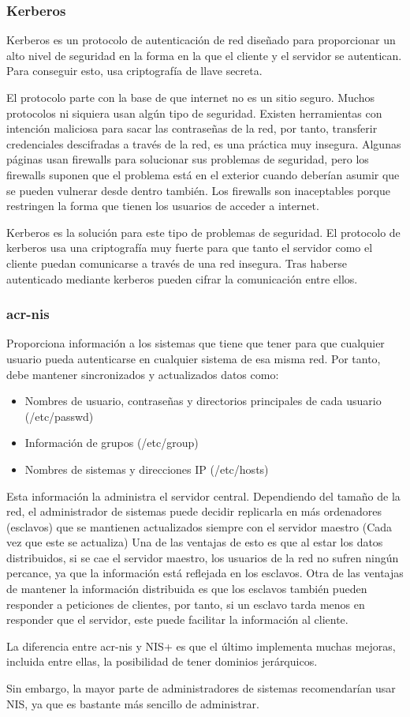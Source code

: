 \documentclass[titlepage, 12pt, a4paper]{article}
\begin{document}
\subsubsection{Kerberos}
Kerberos es un protocolo de autenticación de red diseñado para proporcionar un alto nivel de seguridad en la forma en la que el cliente y el servidor se autentican. Para conseguir esto, usa criptografía de llave secreta.\cite{mit-kerberos}\par El protocolo parte con la base de que internet no es un sitio seguro. Muchos protocolos ni siquiera usan algún tipo de seguridad. Existen herramientas con intención maliciosa para sacar las contraseñas de la red, por tanto, transferir credenciales descifradas a través de la red, es una práctica muy insegura. Algunas páginas usan \gls{firewalls} para solucionar sus problemas de seguridad, pero los \gls{firewalls} suponen que el problema está en el exterior cuando deberían asumir que se pueden vulnerar desde dentro también. Los \gls{firewalls} son inaceptables porque restringen la forma que tienen los usuarios de acceder a internet.\par Kerberos es la solución para este tipo de problemas de seguridad. El protocolo de \gls{kerberos} usa una criptografía muy fuerte para que tanto el servidor como el cliente puedan comunicarse a través de una red insegura. Tras haberse autenticado mediante \gls{kerberos} pueden cifrar la comunicación entre ellos.
\subsubsection{\gls{acr-nis}}
Proporciona información a los sistemas que tiene que tener para que cualquier usuario pueda autenticarse en cualquier sistema de esa misma red. Por tanto, debe mantener sincronizados y actualizados datos como:
\begin{itemize}
	\item Nombres de usuario, contraseñas y directorios principales de cada usuario (/etc/passwd)
	\item Información de grupos (/etc/group)
	\item Nombres de sistemas y direcciones IP (/etc/hosts)
\end{itemize}
Esta información la administra el servidor central. Dependiendo del tamaño de la red, el administrador de sistemas puede decidir replicarla en más ordenadores (esclavos) que se mantienen actualizados siempre con el servidor maestro (Cada vez que este se actualiza) Una de las ventajas de esto es que al estar los datos distribuidos, si se cae el servidor maestro, los usuarios de la red no sufren ningún percance, ya que la información está reflejada en los esclavos. Otra de las ventajas de mantener la información distribuida es que los esclavos también pueden responder a peticiones de clientes, por tanto, si un esclavo tarda menos en responder que el servidor, este puede facilitar la información al cliente.\par La diferencia entre \gls{acr-nis} y NIS+ es que el último implementa muchas mejoras, incluida entre ellas, la posibilidad de tener dominios jerárquicos.\par Sin embargo, la mayor parte de administradores de sistemas recomendarían usar NIS, ya que es bastante más sencillo de administrar.
\end{document}
